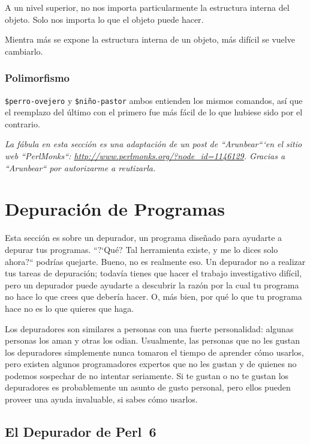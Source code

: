 A un nivel superior, no nos importa particularmente
la estructura interna del objeto. Solo nos importa
lo que el objeto puede hacer.

Mientra más se expone la estructura interna de un objeto,
más difícil se vuelve cambiarlo.

\subsubsection{Polimorfismo}
\verb|$perro-ovejero| y \verb|$niño-pastor| ambos
entienden los mismos comandos, así que el reemplazo
del último con el primero fue más fácil de lo que
hubiese sido por el contrario.

\emph{La fábula en esta sección es una adaptación de
un post de ``Arunbear```en el sitio web ``PerlMonks``:
\url{http://www.perlmonks.org/?node_id=1146129}. Gracias
a ``Arunbear`` por autorizarme a reutizarla.}


\section{Depuración de Programas}
\label{perl-debugger}

Esta sección es sobre un depurador, un programa diseñado para
ayudarte a depurar tus programas. ``?`Qué? Tal herramienta existe,
y me lo dices solo ahora?`` podrías quejarte. Bueno, no es realmente
eso. Un depurador no a realizar tus tareas de depuración; todavía 
tienes que hacer el trabajo investigativo difícil, pero un depurador
puede ayudarte a descubrir la razón por la cual tu programa
no hace lo que crees que debería hacer. O, más bien, por qué lo
que tu programa hace no es lo que quieres que haga.

Los depuradores son similares a personas con una fuerte
personalidad: algunas personas los aman y otras los odian. Usualmente,
las personas que no les gustan los depuradores simplemente
nunca tomaron el tiempo de aprender cómo usarlos, pero existen 
algunos programadores expertos que no les gustan y de quienes 
no podemos sospechar de no intentar seriamente. Si te gustan
o no te gustan los depuradores es probablemente un asunto de
gusto personal, pero ellos pueden proveer una ayuda invaluable, si sabes 
cómo usarlos.

\subsection{El Depurador de Perl~6}

